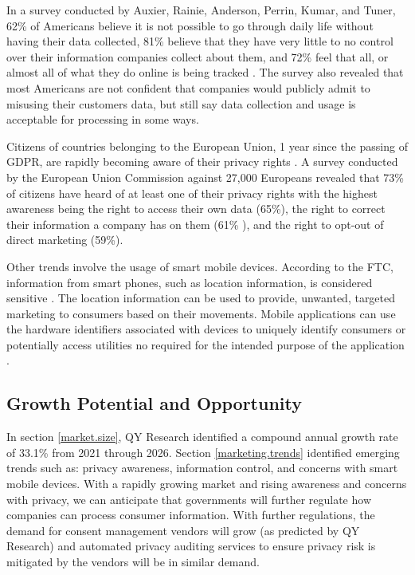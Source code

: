 In a survey conducted by Auxier, Rainie, Anderson, Perrin, Kumar, and Tuner, 62\% of Americans believe it is not possible to go through daily life without having their data collected, 81\% believe that they have very little to no control over their information companies collect about them, and 72\% feel that all, or almost all of what they do online is being tracked \cite{pewresearch.2019}. The survey also revealed that most Americans are not confident that companies would publicly admit to misusing their customers data, but still say data collection and usage is acceptable for processing in some ways.

Citizens of countries belonging to the European Union, 1 year since the passing of GDPR, are rapidly becoming aware of their privacy rights \cite{eucomm.2019}. A survey conducted by the European Union Commission against 27,000 Europeans revealed that 73\% of citizens have heard of at least one of their privacy rights with the highest awareness being the right to access their own data (65\%), the right to correct their information a company has on them (61\% ), and the right to opt-out of direct marketing (59\%).

Other trends involve the usage of smart mobile devices. According to the FTC, information from smart phones, such as location information, is considered sensitive \cite{ftc.mobile.2012}. The location information can be used to provide, unwanted, targeted marketing to consumers based on their movements. Mobile applications can use the hardware identifiers associated with devices to uniquely identify consumers or potentially access utilities no required for the intended purpose of the application \cite{tama.mobile.2012}.

\subsection{Growth Potential and Opportunity}

In section \ref{market.size}, QY Research identified a compound annual growth rate of 33.1\% from 2021 through 2026. Section \ref{marketing.trends} identified emerging trends such as: privacy awareness, information control, and concerns with smart mobile devices. With a rapidly growing market and rising awareness and concerns with privacy, we can anticipate that governments will further regulate how companies can process consumer information. With further regulations, the demand for consent management vendors will grow (as predicted by QY Research) and  automated privacy auditing services to ensure privacy risk is mitigated by the vendors will be in similar demand. 

